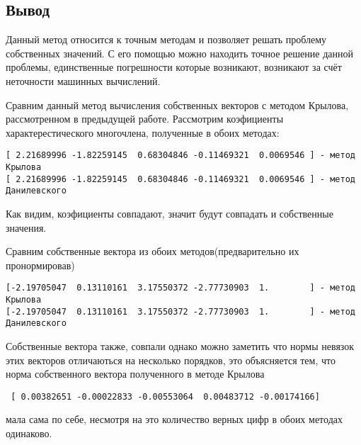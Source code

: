 \documentclass[11.4pt]{article}
\begin{document}
	\subsection{Вывод}
Данный метод относится к точным методам и позволяет решать проблему собственных значений. С его помощью можно находить точное решение данной проблемы, единственные погрешности которые возникают, возникают за счёт неточности машинных вычислений.\par
Сравним данный метод вычисления собственных векторов с методом Крылова, рассмотренном в предыдущей работе. Рассмотрим коэфициенты характерестического многочлена, полученные в обоих методах: 
\begin{verbatim}
[ 2.21689996 -1.82259145  0.68304846 -0.11469321  0.0069546 ] - метод Крылова
[ 2.21689996 -1.82259145  0.68304846 -0.11469321  0.0069546 ] - метод Данилевского
\end{verbatim} 
Как видим, коэфициенты совпадают, значит будут совпадать и собственные значения.\par 
Сравним собственные вектора из обоих методов(предварительно их пронормировав)
\begin{verbatim}
[-2.19705047  0.13110161  3.17550372 -2.77730903  1.        ] - метод Крылова
[-2.19705047  0.13110161  3.17550372 -2.77730903  1.        ] - метод Данилевского
\end{verbatim} 
Собственные вектора также, совпали однако можно заметить что нормы невязок этих векторов отличаються на несколько порядков, это объясняется тем, что норма собственного вектора полученного в методе Крылова \begin{verbatim}
 [ 0.00382651 -0.00022833 -0.00553064  0.00483712 -0.00174166]
 \end{verbatim}
мала сама по себе, несмотря на это количество верных цифр в обоих методах одинаково.
\end{document}
